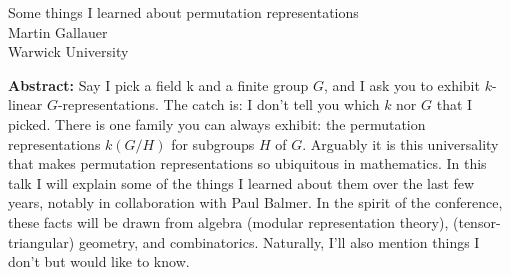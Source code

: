 \documentclass[12pt,a4paper]{article}
\begin{document}
\thispagestyle{empty} 
\begin{center}
{\large  Some things I learned about permutation representations}\\
\vspace*{.5cm}
Martin Gallauer\\
Warwick University\\
\end{center}
\vspace*{.8cm}

{\bf Abstract:} Say I pick a field k and a finite group $G$, and I ask you to exhibit $k$-linear $G$-representations. The catch is: I don't tell you which $k$ nor $G$ that I picked. There is one family you can always exhibit: the permutation representations $k(G/H)$ for subgroups $H$ of $G$. Arguably it is this universality that makes permutation representations so ubiquitous in mathematics.
In this talk I will explain some of the things I learned about them over the last few years, notably in collaboration with Paul Balmer. In the spirit of the conference, these facts will be drawn from algebra (modular representation theory), (tensor-triangular) geometry, and combinatorics. Naturally, I'll also mention things I don't but would like to know.
\end{document}
